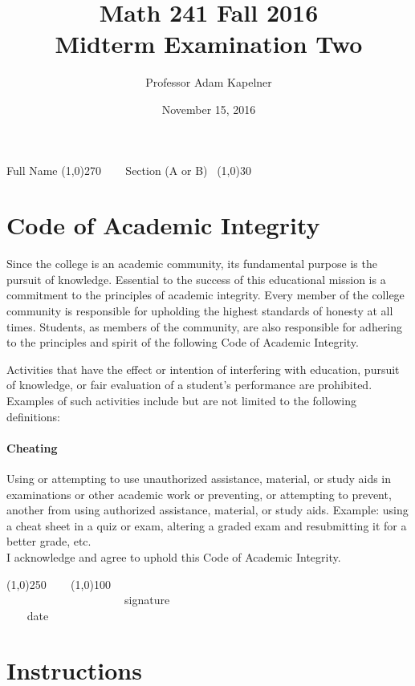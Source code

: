 \documentclass[12pt]{article}
\title{Math 241 Fall 2016 \\ Midterm Examination Two}
\author{Professor Adam Kapelner}
\date{November 15, 2016}
\begin{document}
\maketitle

\noindent Full Name \line(1,0){270} ~~~ Section (A or B)~ \line(1,0){30}

\thispagestyle{empty}

\section*{Code of Academic Integrity}

\footnotesize
Since the college is an academic community, its fundamental purpose is the pursuit of knowledge. Essential to the success of this educational mission is a commitment to the principles of academic integrity. Every member of the college community is responsible for upholding the highest standards of honesty at all times. Students, as members of the community, are also responsible for adhering to the principles and spirit of the following Code of Academic Integrity.

Activities that have the effect or intention of interfering with education, pursuit of knowledge, or fair evaluation of a student's performance are prohibited. Examples of such activities include but are not limited to the following definitions:

\paragraph{Cheating} Using or attempting to use unauthorized assistance, material, or study aids in examinations or other academic work or preventing, or attempting to prevent, another from using authorized assistance, material, or study aids. Example: using a cheat sheet in a quiz or exam, altering a graded exam and resubmitting it for a better grade, etc.
\\

\noindent I acknowledge and agree to uphold this Code of Academic Integrity. \\

\begin{center}
\line(1,0){250} ~~~ \line(1,0){100}\\
~~~~~~~~~~~~~~~~~~~~~signature~~~~~~~~~~~~~~~~~~~~~~~~~~~~~~~~~~~~~~~~~~~~~ date
\end{center}

\normalsize

\section*{Instructions}
\end{document}
